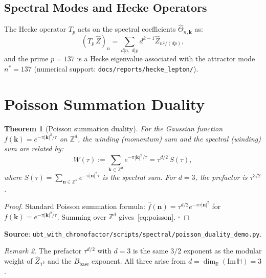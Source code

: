 \documentclass[11pt,a4paper]{article}
\newtheorem{theorem}{Theorem}[section]
\theoremstyle{definition}
\theoremstyle{remark}
\newtheorem{remark}[theorem]{Remark}
\begin{document}
\subsection{Spectral Modes and Hecke Operators}

The Hecke operator $T_p$ acts on the spectral coefficients $\hat{\Theta}_{n,\mathbf{k}}$
as:
\begin{equation}
  (T_p\,\hat{Z})_n
  = \sum_{d|n,\; d|p} d^{k-1}\hat{Z}_{n^2/(dp)},
\end{equation}
and the prime $p = 137$ is a Hecke eigenvalue associated with the attractor mode
$n^* = 137$ (numerical support: \texttt{docs/reports/hecke\_lepton/}).

\section{Poisson Summation Duality}\label{sec:poisson}

\begin{theorem}[Poisson summation duality]\label{thm:poisson}
For the Gaussian function $f(\mathbf{k}) = e^{-\pi|\mathbf{k}|^2/\tau}$
on $\mathbb{Z}^d$, the winding (momentum) sum and the spectral (winding) sum
are related by:
\begin{equation}\label{eq:poisson}
  W(\tau)
  := \sum_{\mathbf{k}\in\mathbb{Z}^d} e^{-\pi|\mathbf{k}|^2/\tau}
  = \tau^{d/2}\,S(\tau),
\end{equation}
where $S(\tau) = \sum_{\mathbf{n}\in\mathbb{Z}^d} e^{-\pi|\mathbf{n}|^2\tau}$
is the spectral sum.  For $d=3$, the prefactor is $\tau^{3/2}$.
\end{theorem}

\begin{proof}
Standard Poisson summation formula:
$\hat{f}(\mathbf{n}) = \tau^{d/2}e^{-\pi\tau|\mathbf{n}|^2}$
for $f(\mathbf{k}) = e^{-\pi|\mathbf{k}|^2/\tau}$.
Summing over $\mathbb{Z}^d$ gives~\eqref{eq:poisson}. $\square$
\end{proof}

\noindent\textbf{Source}: \texttt{ubt\_with\_chronofactor/scripts/spectral/poisson\_duality\_demo.py}.

\begin{remark}
The prefactor $\tau^{d/2}$ with $d = 3$ is the same $3/2$ exponent as the
modular weight of $\hat{Z}_{T^3}$ and the $B_{\mathrm{base}}$ exponent.
All three arise from $d = \dim_\mathbb{R}(\mathrm{Im}\,\mathbb{H}) = 3$.
\end{remark}
\end{document}
